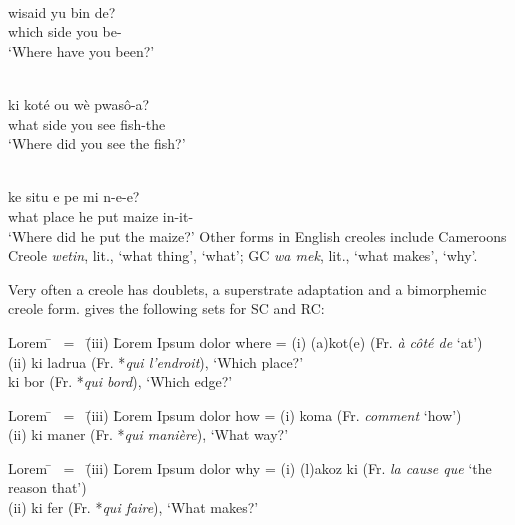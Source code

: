 \ea\label{ex:2:79}
\ili{\langGC}{}{}\\
 \gll wisaid yu bin de?\\
{which side} you {\TNS} be-\LOC \\
\glt `Where have you been?'
\z

\newpage
\ea\label{ex:2:80}
\ili{\langHC}{}{}\\
\gll ki koté ou wè pwas{\^o}-a?\\
what side you see fish-the\\
\glt `Where did you see the fish?'
\z

\ea\label{ex:2:81}
\ili{\langST}{}{}\\
\gll ke situ e pe mi n-e-e?\\
what place he put maize in-it-\QP\\
\glt `Where did he put the maize?'
\z
Other forms in English creoles include Cameroons Creole \textit{wetin}, lit., `what thing', `what'; GC \textit{wa mek}, lit., `what makes', `why'.

Very often a creole has doublets, a superstrate adaptation and a bimorphemic creole form. \citet[509]{Papen1978} gives the following sets for SC and RC:


\ea\label{ex:2:82} \begin{tabbing}	Lorem \= ~{\rm =}~ \= {\rm (iii)} \= Lorem Ipsum dolor \kill
					where \> {\rm =} \> {\rm (i)} \> (a)kot(e) {\rm (Fr. {\it à côté de} `at')}\\
					\> \> {\rm (ii)} \> ki ladrua {\rm (Fr. *{\it qui l'endroit}), `Which place?'}\\
					\> \> \> ki bor {\rm (Fr. *{\it qui bord}), `Which edge?'}
					\end{tabbing}\z

\ea\label{ex:2:83} \begin{tabbing}	Lorem \= ~{\rm =}~ \= {\rm (iii)} \= Lorem Ipsum dolor \kill
					how \> {\rm =} \> {\rm (i)} \> koma {\rm (Fr. {\it comment} `how')}\\
					\> \> {\rm (ii)} \> ki maner {\rm (Fr. *{\it qui manière}), `What way?'}\end{tabbing}\z

\ea\label{ex:2:84} \begin{tabbing}	Lorem \= ~{\rm =}~ \= {\rm (iii)} \= Lorem Ipsum dolor \kill
					why \> {\rm =} \> {\rm (i)} \> (l)akoz ki {\rm (Fr. {\it la cause que} `the reason that')}\\
					\> \> {\rm (ii)} \> ki fer {\rm (Fr. *{\it qui faire}), `What makes?'}\end{tabbing}\z


